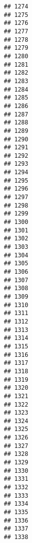 \documentclass[
]{article}
\begin{document}
\begin{verbatim}
## 1274                                           
## 1275                                           
## 1276                                           
## 1277                                           
## 1278                                           
## 1279                                           
## 1280                                           
## 1281                                           
## 1282                                           
## 1283                                           
## 1284                                           
## 1285                                           
## 1286                                           
## 1287                                           
## 1288                                           
## 1289                                           
## 1290                                           
## 1291                                           
## 1292                                           
## 1293                                           
## 1294                                           
## 1295                                           
## 1296                                           
## 1297                                           
## 1298                                           
## 1299                                           
## 1300                                           
## 1301                                           
## 1302                                           
## 1303                                           
## 1304                                           
## 1305                                           
## 1306                                           
## 1307                                           
## 1308                                           
## 1309                                           
## 1310                                           
## 1311                                           
## 1312                                           
## 1313                                           
## 1314                                           
## 1315                                           
## 1316                                           
## 1317                                           
## 1318                                           
## 1319                                           
## 1320                                           
## 1321                                           
## 1322                                           
## 1323                                           
## 1324                                           
## 1325                                           
## 1326                                           
## 1327                                           
## 1328                                           
## 1329                                           
## 1330                                           
## 1331                                           
## 1332                                           
## 1333                                           
## 1334                                           
## 1335                                           
## 1336                                           
## 1337                                           
## 1338
\end{verbatim}
\end{document}
